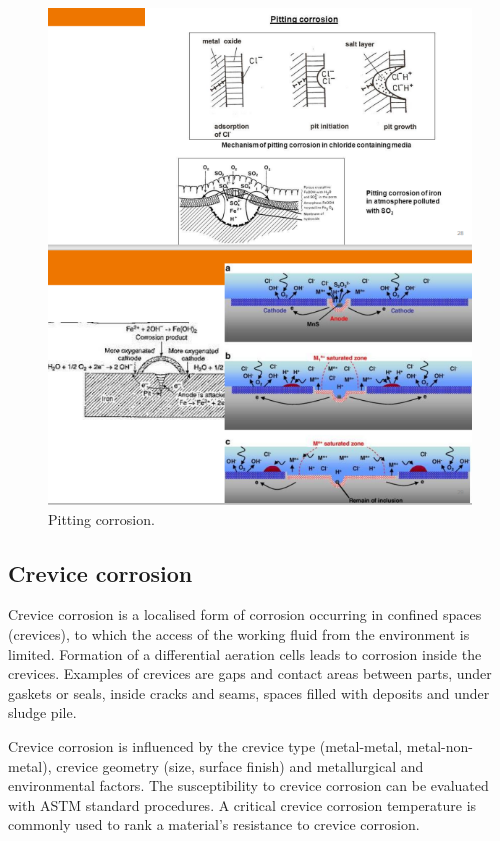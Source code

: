 \begin{figure}[H]
    \centering
    \includegraphics[width = \textwidth]{img/figure75.png}
    \caption{Pitting corrosion.}
\end{figure}
\subsection{Crevice corrosion}
Crevice corrosion is a localised form of corrosion occurring in confined spaces (crevices), to which the access of the working fluid from the environment is limited. Formation of a differential aeration cells leads to corrosion inside the crevices. Examples of crevices are gaps and contact areas between parts, under gaskets or seals, inside cracks and seams, spaces filled with deposits and under sludge pile.

Crevice corrosion is influenced by the crevice type (metal-metal, metal-non-metal), crevice geometry (size, surface finish) and metallurgical and environmental factors. The susceptibility to crevice corrosion can be evaluated with ASTM standard procedures. A critical crevice corrosion temperature is commonly used to rank a material's resistance to crevice corrosion.
